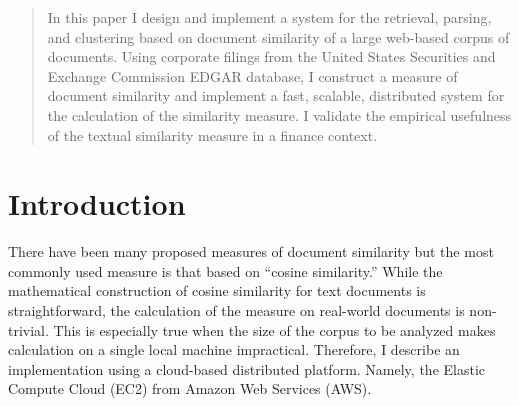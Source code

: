 \documentclass{article}
\begin{document}
 

\begin{abstract} 
In this paper I design and implement a system for the retrieval, parsing, and 
clustering based on document similarity of a large web-based corpus of 
documents. Using corporate filings from the United States Securities and 
Exchange Commission EDGAR database, I construct a measure of document 
similarity and implement a fast, scalable, distributed system for the calculation 
of the similarity measure. I validate the empirical usefulness of the textual 
similarity measure in a finance context.
\end{abstract} 

\section{Introduction}\label{intro}
There have been many proposed measures of document similarity but the most commonly used measure is that based on ``cosine similarity.''
While the mathematical construction of cosine similarity for text documents is straightforward, the calculation of the measure on real-world documents is non-trivial. This is especially true when the size of the corpus to be analyzed makes calculation on a single local machine impractical. Therefore, I describe an implementation using a cloud-based distributed platform. Namely, the Elastic Compute Cloud (EC2) from Amazon Web Services (AWS).
\end{document}
